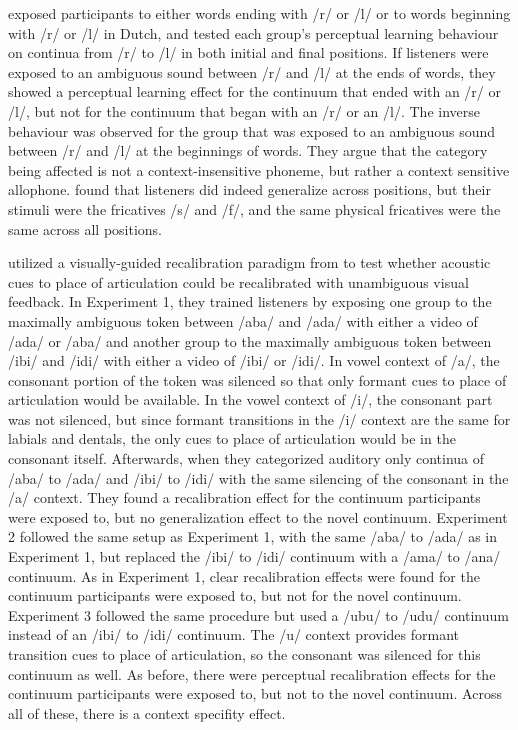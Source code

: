 \citet{Mitterer2013} exposed participants to either words ending with /r/ or /l/ or to words beginning with /r/ or /l/ in Dutch, and tested each group's perceptual learning behaviour on continua from /r/ to /l/ in both initial and final positions.  
If listeners were exposed to an ambiguous sound between /r/ and /l/ at the ends of words, they showed a perceptual learning effect for the continuum that ended with an /r/ or /l/, but not for the continuum that began with an /r/ or an /l/.  
The inverse behaviour was observed for the group that was exposed to an ambiguous sound between /r/ and /l/ at the beginnings of words.  
They argue that the category being affected is not a context-insensitive phoneme, but rather a context sensitive allophone.  
\citet{Jesse2011} found that listeners did indeed generalize across positions, but their stimuli were the fricatives /s/ and /f/, and the same physical fricatives were the same across all positions.


\citet{Reinisch2014} utilized a visually-guided recalibration paradigm from \citet{Bertelson2003} to test whether acoustic cues to place of articulation could be recalibrated with unambiguous visual feedback.  
In Experiment 1, they trained listeners by exposing one group to the maximally ambiguous token between /aba/ and /ada/ with either a video of /ada/ or /aba/ and another group to the maximally ambiguous token between /ibi/ and /idi/ with either a video of /ibi/ or /idi/.  
In vowel context of /a/, the consonant portion of the token was silenced so that only formant cues to place of articulation would be available.  
In the vowel context of /i/, the consonant part was not silenced, but since formant transitions in the /i/ context are the same for labials and dentals, the only cues to place of articulation would be in the consonant itself.  
Afterwards, when they categorized auditory only continua of /aba/ to /ada/ and /ibi/ to /idi/ with the same silencing of the consonant in the /a/ context.  They found a recalibration effect for the continuum participants were exposed to, but no generalization effect to the novel continuum.  
Experiment 2 followed the same setup as Experiment 1, with the same /aba/ to /ada/ as in Experiment 1, but replaced the /ibi/ to /idi/ continuum with a /ama/ to /ana/ continuum.  
As in Experiment 1, clear recalibration effects were found for the continuum participants were exposed to, but not for the novel continuum.  
Experiment 3 followed the same procedure but used a /ubu/ to /udu/ continuum instead of an /ibi/ to /idi/ continuum.  
The /u/ context provides formant transition cues to place of articulation, so the consonant was silenced for this continuum as well.  
As before, there were perceptual recalibration effects for the continuum participants were exposed to, but not to the novel continuum.  
Across all of these, there is a context specifity effect. 

